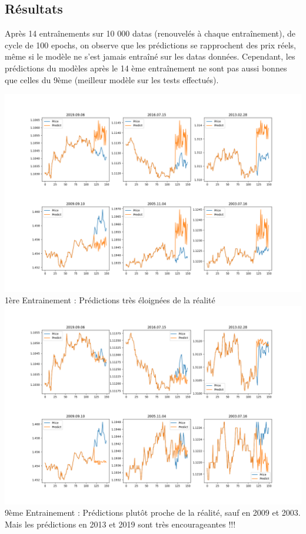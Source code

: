 \documentclass[12pt,a4paper]{article}
\begin{document}
\subsection*{Résultats}
Après 14 entraînements sur 10 000 datas (renouvelés à chaque entraînement), de cycle de 100 epochs, on observe que les prédictions se rapprochent des prix réels, même si le modèle ne s'est jamais entraîné sur les datas données. Cependant, les prédictions du modèles après le 14 ème entraînement ne sont pas aussi bonnes que celles du 9ème (meilleur modèle sur les tests effectués).

\begin{center}
\includegraphics[scale=0.25,trim={0 2cm 0 0},clip]{1-2020-03-18.png} 
\\1ère Entrainement : Prédictions très éloignées de la réalité
\includegraphics[scale=0.25,trim={0 2cm 0 0},clip]{9-2020-03-18.png} 
\\9ème Entrainement : Prédictions plutôt proche de la réalité, sauf en 2009 et 2003. Mais les prédictions en 2013 et 2019 sont très encourageantes !!!

\end{center}
\end{document}
